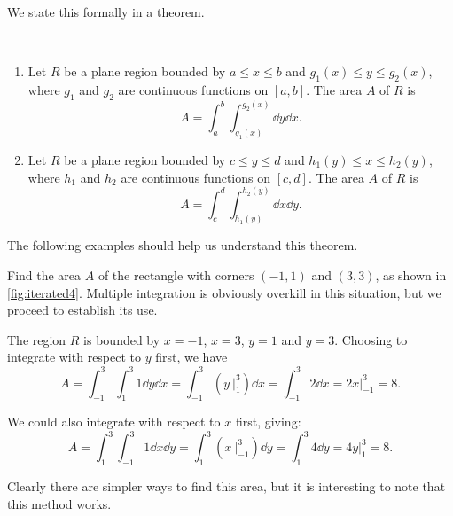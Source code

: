 We state this formally in a theorem.

\begin{theorem}\label{thm:area_plane_region}
\mbox{}\\[-2\baselineskip]\parbox[t]{\linewidth}{%
\begin{enumerate}
	\item Let $R$ be a plane region bounded by $a\leq x\leq b$ and $g_1(x)\leq y\leq g_2(x)$, where $g_1$ and $g_2$ are continuous functions on $[a,b]$. The area $A$ of $R$ is
	\[A = \int_a^b\int_{g_1(x)}^{g_2(x)} \dd y\dd x.\]
	\item Let $R$ be a plane region bounded by $c\leq y\leq d$ and $h_1(y)\leq x\leq h_2(y)$, where $h_1$ and $h_2$ are continuous functions on $[c,d]$. The area $A$ of $R$ is
	\[A = \int_c^d\int_{h_1(y)}^{h_2(y)} \dd x\dd y.\]
\end{enumerate}}
\end{theorem}

The following examples should help us understand this theorem.

\begin{example}\label{ex_iterated4}
Find the area $A$ of the rectangle with corners $(-1,1)$ and $(3,3)$, as shown in \autoref{fig:iterated4}.
\solution
Multiple integration is obviously overkill in this situation, but we proceed to establish its use.


The region $R$ is bounded by $x=-1$, $x=3$, $y=1$ and $y=3$. Choosing to integrate with respect to $y$ first, we have 
\[
 A = \int_{-1}^3\int_1^3 1\dd y\dd x = \int_{-1}^3 \left(y\ \Big|_1^3\right)\dd x
 = \int_{-1}^3 2\dd x = 2x\Big|_{-1}^3=8.
\]

We could also integrate with respect to $x$ first, giving:
\[
 A = \int_1^3\int_{-1}^3 1\dd x \dd y =\int_1^3 \left(x\ \Big|_{-1}^3\right)\dd y
 = \int_1^3 4\dd y = 4y\Big|_1^3 = 8.
\]

Clearly there are simpler ways to find this area, but it is interesting to note that this method works.
\end{example}

